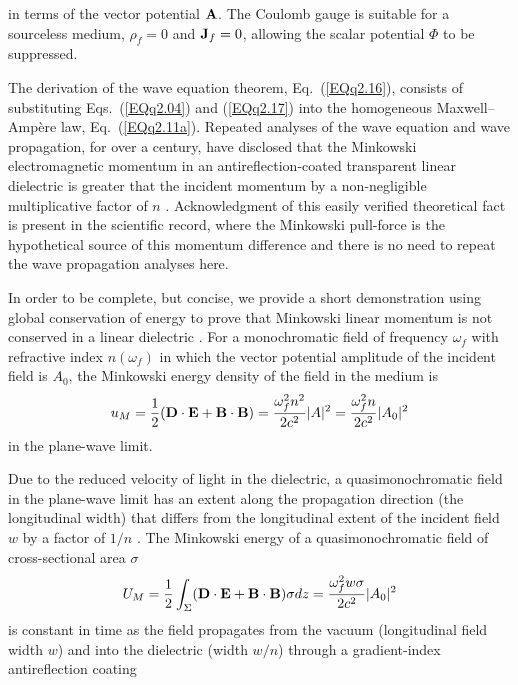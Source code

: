 \documentclass[twocolumn,amssymb,eqsecnum,aps,pra]{revtex4-2}
\begin{document}
in terms of the vector potential ${\bf A}$.
The Coulomb gauge is suitable for a sourceless medium, $\rho_f=0$
and ${\bf J}_f=0$, allowing the scalar potential $\Phi$ to be
suppressed.
\par
The derivation of the wave equation theorem, Eq.~(\ref{EQq2.16}),
consists of substituting Eqs.~(\ref{EQq2.04}) and (\ref{EQq2.17})
into the homogeneous Maxwell--Amp\`ere law, Eq.~(\ref{EQq2.11a}).
Repeated analyses of the wave equation and wave propagation, for
over a century, have disclosed that the Minkowski electromagnetic
momentum in an antireflection-coated transparent linear dielectric
is greater that the incident momentum by a non-negligible
multiplicative factor of $n$ \cite{BIPfei,BIFofn1,BIFofn2,BIGord}.
Acknowledgment of this easily verified theoretical fact is present 
in the scientific record, where the Minkowski
pull-force is the hypothetical source of
this momentum difference and there is no need to repeat the
wave propagation analyses here.
\par
In order to be complete, but concise, we provide a short demonstration 
using global conservation of energy to prove that Minkowski linear
momentum is not conserved in a linear dielectric
\cite{BIPfei,BIFofn1,BIFofn2,BIGord}.
For a monochromatic field of frequency $\omega_f$ with
refractive index $n(\omega_f)$ in which the vector
potential amplitude of the incident field is $A_0$, the Minkowski
energy density \cite{BIJackson,BIGriff,BIZangwill} of the field
in the medium is
\begin{equation}
u_M=\frac{1}{2}({\bf D}\cdot{\bf E}+{\bf B}\cdot{\bf B}) 
=\frac{\omega_f^2 n^2}{2c^2}|A|^2
=\frac{\omega_f^2 n}{2c^2}|A_0|^2
\label{EQq2.18}
\end{equation}
in the plane-wave limit.
\par
Due to the reduced velocity of light in the dielectric,
a quasimonochromatic field in the plane-wave limit has an
extent along the propagation direction (the longitudinal width)
that differs from the longitudinal extent of the incident field
$w$ by a factor of $1/n$ 
\cite{BIOptCommun}.
The Minkowski energy of a
quasimonochromatic field of cross-sectional area $\sigma$
\begin{equation}
U_M=\frac{1}{2}\int_{\Sigma}
({\bf D}\cdot{\bf E}+{\bf B}\cdot{\bf B})\sigma dz 
=\frac{\omega_f^2 w \sigma}{2c^2}|A_0|^2
\label{EQq2.19}
\end{equation}
is constant in time as the field propagates from the
vacuum (longitudinal field width $w$) and into the dielectric
(width $w/n$) through a gradient-index antireflection coating
\end{document}
